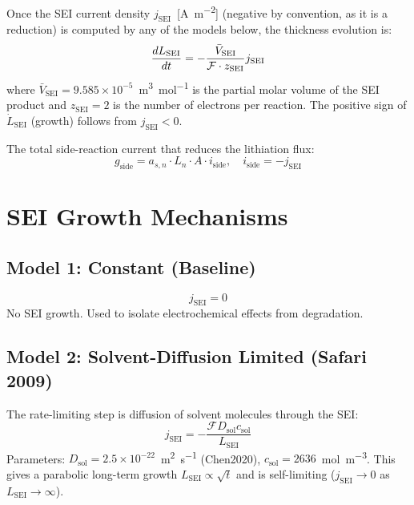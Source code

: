 Once the SEI current density $j_\text{SEI}$~[\si{\ampere\per\meter\squared}] (negative by convention, as it is a reduction) is computed by any of the models below, the thickness evolution is:
\begin{equation}
  \dfrac{d L_\text{SEI}}{dt} = -\frac{\bar{V}_\text{SEI}}{\mathcal{F} \cdot z_\text{SEI}} j_\text{SEI}
  \label{eq:Lsei_ode}
\end{equation}
where $\bar{V}_\text{SEI} = 9.585\times10^{-5}$~\si{\meter\cubed\per\mol} is the partial molar volume of the SEI product and $z_\text{SEI} = 2$ is the number of electrons per reaction. The positive sign of $\dot{L}_\text{SEI}$ (growth) follows from $j_\text{SEI} < 0$.

The total side-reaction current that reduces the lithiation flux:
\begin{equation}
  g_\text{side} = a_{s,n} \cdot L_n \cdot A \cdot i_\text{side}, \quad i_\text{side} = -j_\text{SEI}
  \label{eq:g_side}
\end{equation}

\section{SEI Growth Mechanisms}
\label{sec:sei_mechanisms}

\subsection{Model 1: Constant (Baseline)}
\begin{equation}
  j_\text{SEI} = 0
  \label{eq:sei_constant}
\end{equation}
No SEI growth. Used to isolate electrochemical effects from degradation.

\subsection{Model 2: Solvent-Diffusion Limited (Safari 2009)~\cite{Safari2009}}

The rate-limiting step is diffusion of solvent molecules through the SEI:
\begin{equation}
  j_\text{SEI} = -\frac{\mathcal{F} D_\text{sol} c_\text{sol}}{L_\text{SEI}}
  \label{eq:sei_solvent}
\end{equation}
Parameters: $D_\text{sol} = 2.5\times10^{-22}$~\si{\meter\squared\per\second} (Chen2020), $c_\text{sol} = 2636$~\si{\mol\per\meter\cubed}. This gives a parabolic long-term growth $L_\text{SEI} \propto \sqrt{t}$ and is self-limiting ($j_\text{SEI} \to 0$ as $L_\text{SEI} \to \infty$).

